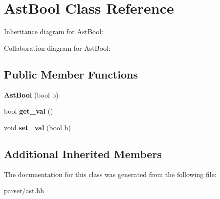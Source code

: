 \hypertarget{classAstBool}{}\section{Ast\+Bool Class Reference}
\label{classAstBool}


Inheritance diagram for Ast\+Bool\+:


Collaboration diagram for Ast\+Bool\+:
\subsection*{Public Member Functions}
\begin{DoxyCompactItemize}
\item 
\mbox{\label{classAstBool_a3c51a717de44310a9ab54949bed7086b}} 
{\bfseries Ast\+Bool} (bool b)
\item 
\mbox{\label{classAstBool_aa615a40451eee7b3cac5bc216b5a7353}} 
bool {\bfseries get\+\_\+val} ()
\item 
\mbox{\label{classAstBool_a042f35edf5691062538a3f398e5c4bf5}} 
void {\bfseries set\+\_\+val} (bool b)
\end{DoxyCompactItemize}
\subsection*{Additional Inherited Members}


The documentation for this class was generated from the following file\+:\begin{DoxyCompactItemize}
\item 
parser/ast.\+hh\end{DoxyCompactItemize}
